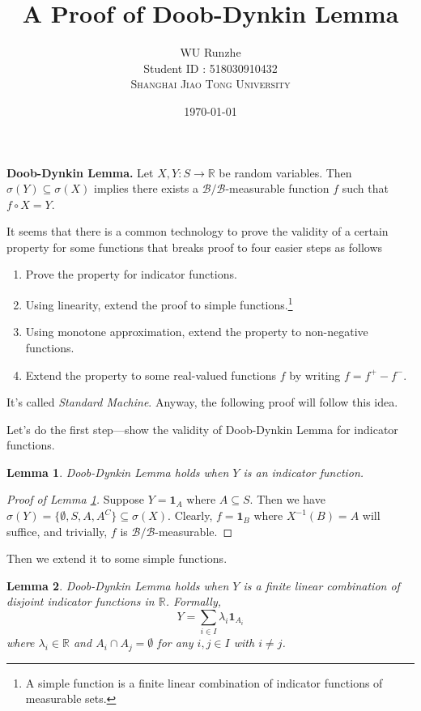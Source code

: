 \documentclass[12pt]{article}
\title{A Proof of Doob-Dynkin Lemma}
\author{WU Runzhe\\
	Student ID : 518030910432\\
	\textsc{Shanghai Jiao Tong University}}
\date{\today}
\newcommand\bR{\mathbb{R}}
\newcommand{\ind}[1]{\mathbf{1}_{#1}}
\newtheorem{lemma}{Lemma}
\begin{document}
	\maketitle
	
	\begin{tcolorbox}
		\textbf{Doob-Dynkin Lemma.}
			Let $X,Y:S\rightarrow \bR$ be random variables. Then $\sigma(Y)\subseteq\sigma(X)$ implies there exists a $\mathcal{B}/\mathcal{B}$-measurable function $f$ such that $f\circ X=Y$.
	\end{tcolorbox}

	It seems that there is a common technology to prove the validity of a certain property for some functions that breaks proof to four easier steps as follows
	
	\begin{enumerate}[(1)]
		\item Prove the property for indicator functions.
		\item Using linearity, extend the proof to simple functions.\footnote{A simple function is a finite linear combination of indicator functions of measurable sets.}
		\item Using monotone approximation, extend the property to non-negative functions.
		\item Extend the property to some real-valued functions $f$ by writing $f=f^+-f^-$.
	\end{enumerate}

	It's called \textit{Standard Machine}. Anyway, the following proof will follow this idea.
	
	Let's do the first step---show the validity of Doob-Dynkin Lemma for indicator functions.

	\begin{lemma}\label{indic_func}
		Doob-Dynkin Lemma holds when $Y$ is an indicator function.
	\end{lemma}

	\begin{proof}[Proof of Lemma \ref{indic_func}]
		Suppose $Y=\ind{A}$ where $A\subseteq S$. Then we have  $\sigma(Y)=\{\emptyset,S,A,A^C\}\subseteq\sigma(X)$. Clearly, $f=\ind{B}$ where $X^{-1}(B)=A$ will suffice, and trivially, $f$ is $\mathcal{B}/\mathcal{B}$-measurable.
	\end{proof}

	Then we extend it to some simple functions.

	\begin{lemma}\label{sim}
		Doob-Dynkin Lemma holds when $Y$ is a finite linear combination of disjoint indicator functions in $\bR$. Formally, 
		$$Y=\sum_{i\in I}\lambda_i\ind{A_i}$$
		where $\lambda_i\in\bR$ and $A_i\cap A_j=\emptyset$ for any $i,j\in I$ with $i\not=j$.
	\end{lemma}
\end{document}
